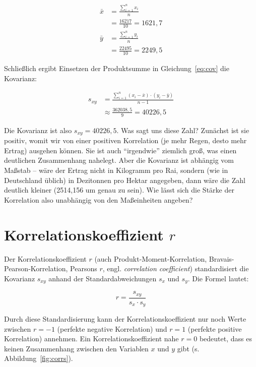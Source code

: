 \documentclass[
  11pt,
  ngerman,
  a4paper,
]{report}
\begin{document}
\[
\begin{aligned}
\bar{x}&=\frac{\sum\limits^n_{i=1}x_i}{n}\\[5pt]
       &=\frac{16217}{10}=1621{,}7\\[6pt]
\bar{y}&=\frac{\sum\limits^n_{i=1}y_i}{n}\\[5pt]
       &=\frac{22495}{10}=2249{,}5
\end{aligned}
\]

Schließlich ergibt Einsetzen der Produktsumme in Gleichung~\eqref{eq:cov} die Kovarianz:

\[\begin{aligned}
s_{xy}&=\frac{\sum\limits^n_{i=1}(x_i-\bar{x})\cdot(y_i-\bar{y})}{n-1}\\[5pt]
&\approx\frac{362038{,}5}{9}=40226{,}5
\end{aligned}\]

Die Kovarianz ist also \(s_{xy}=40226{,}5\). Was sagt uns diese Zahl? Zunächst ist sie positiv, womit wir von einer positiven Korrelation (je mehr Regen, desto mehr Ertrag) ausgehen können. Sie ist auch \enquote{irgendwie} ziemlich groß, was einen deutlichen Zusammenhang nahelegt. Aber die Kovarianz ist abhängig vom Maßstab -- wäre der Ertrag nicht in Kilogramm pro Rai, sondern (wie in Deutschland üblich) in Dezitonnen pro Hektar angegeben, dann wäre die Zahl deutlich kleiner (2514,156 um genau zu sein). Wie lässt sich die Stärke der Korrelation also unabhängig von den Maßeinheiten angeben?

\hypertarget{korrelationskoeffizient}{%
\section{\texorpdfstring{Korrelationskoeffizient \(r\)}{Korrelationskoeffizient r}}\label{korrelationskoeffizient}}

Der Korrelationskoeffizient \(r\) (auch Produkt-Moment-Korrelation, Bravais-Pearson-Korrelation, Pearsons \(r\), engl. \emph{correlation coefficient}) standardisiert die Kovarianz \(s_{xy}\) anhand der Standardabweichungen \(s_x\) und \(s_y\). Die Formel lautet:

\[
r=\frac{s_{xy}}{s_x\cdot s_y}
\label{eq:cor}
\]

Durch diese Standardisierung kann der Korrelationskoeffizient nur noch Werte zwischen \(r=-1\) (perfekte negative Korrelation) und \(r=1\) (perfekte positive Korrelation) annehmen. Ein Korrelationskoeffizient nahe \(r=0\) bedeutet, dass es keinen Zusammenhang zwischen den Variablen \(x\) und \(y\) gibt (s. Abbildung~\ref{fig:corrs}).
\end{document}
